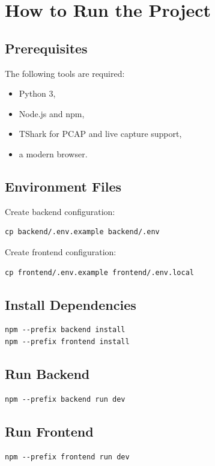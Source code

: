 \documentclass[12pt,a4paper]{report}
\begin{document}
\chapter{How to Run the Project}
\section{Prerequisites}
The following tools are required:
\begin{itemize}[leftmargin=1.5em]
    \item Python 3,
    \item Node.js and npm,
    \item TShark for PCAP and live capture support,
    \item a modern browser.
\end{itemize}

\section{Environment Files}
Create backend configuration:
\begin{lstlisting}[style=codeblock]
cp backend/.env.example backend/.env
\end{lstlisting}

Create frontend configuration:
\begin{lstlisting}[style=codeblock]
cp frontend/.env.example frontend/.env.local
\end{lstlisting}

\section{Install Dependencies}
\begin{lstlisting}[style=codeblock]
npm --prefix backend install
npm --prefix frontend install
\end{lstlisting}

\section{Run Backend}
\begin{lstlisting}[style=codeblock]
npm --prefix backend run dev
\end{lstlisting}

\section{Run Frontend}
\begin{lstlisting}[style=codeblock]
npm --prefix frontend run dev
\end{lstlisting}
\end{document}
